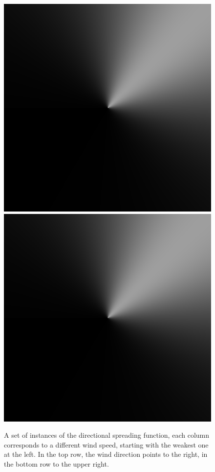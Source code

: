 \begin{figure}
{ }
 \hfill
 \subtop
 {
 \includegraphics[scale=0.25]{figures/donelan_dfilt_wur_sqrt50.png}
 }
 \hfill
 \subtop
 {
 \includegraphics[scale=0.25]{figures/donelan_dfilt_wur_sqrt200.png}
 }
\caption{A set of instances of the directional spreading function, each column 
corresponds to a different wind speed, starting with the weakest one at the 
left. In the top row, the wind direction points to the right, in the bottom row 
to the upper right.}
\label{fig:donelan_directional_filter}
\end{figure}
